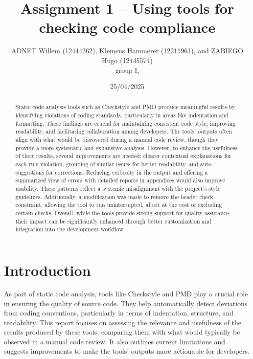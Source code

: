 \documentclass[twocolumn,10pt]{article}
\begin{document}
\title{Assignment 1 -- Using tools for checking code compliance}
\author{ADNET Willem (12444262), Klemens Hammerer (12211961), and ZABIEGO Hugo (12445574) \\
group I, 
}

\date{25/04/2025}




\maketitle

\begin{abstract}
Static code analysis tools such as Checkstyle and PMD produce meaningful results by identifying violations of coding standards, particularly in areas like indentation and formatting. These findings are crucial for maintaining consistent code style, improving readability, and facilitating collaboration among developers. The tools’ outputs often align with what would be discovered during a manual code review, though they provide a more systematic and exhaustive analysis. However, to enhance the usefulness of their results, several improvements are needed: clearer contextual explanations for each rule violation, grouping of similar issues for better readability, and auto-suggestions for corrections. Reducing verbosity in the output and offering a summarized view of errors with detailed reports in appendices would also improve usability. These patterns reflect a systemic misalignment with the project's style guidelines. Additionally, a modification was made to remove the header check constraint, allowing the tool to run uninterrupted, albeit at the cost of excluding certain checks. Overall, while the tools provide strong support for quality assurance, their impact can be significantly enhanced through better customization and integration into the development workflow.
\end{abstract}

\section{Introduction}

As part of static code analysis, tools like Checkstyle and PMD play a crucial role in ensuring the quality of source code. They help automatically detect deviations from coding conventions, particularly in terms of indentation, structure, and readability. This report focuses on assessing the relevance and usefulness of the results produced by these tools, comparing them with what would typically be observed in a manual code review. It also outlines current limitations and suggests improvements to make the tools' outputs more actionable for developers.
\end{document}
